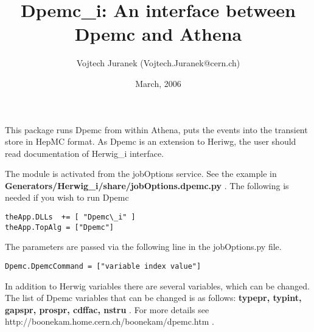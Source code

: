 \documentclass[11pt]{article}
\begin{document}
\title{Dpemc\_i: An interface between Dpemc and Athena}
\author{ Vojtech Juranek (Vojtech.Juranek@cern.ch)}
\date{March, 2006}

\maketitle       

This package runs Dpemc from within Athena, puts the events into the
transient store in HepMC format. 
As Dpemc is an extension to Heriwg, the user should read documentation of Herwig\_i interface. 

The module is activated from the jobOptions service. See the example in {\bf Generators/Herwig\_i/share/jobOptions.dpemc.py }.
The following is needed if you wish to run Dpemc
\begin{verbatim}
theApp.DLLs  += [ "Dpemc\_i" ]  
theApp.TopAlg = ["Dpemc"]
\end{verbatim}
The parameters are passed via the following line in the jobOptions.py
file.
\begin{verbatim}
Dpemc.DpemcCommand = ["variable index value"]
\end{verbatim} 
In addition to Herwig variables there are several variables, which can be changed.
The list of Dpemc variables that can be changed is as follows:
{\bf 
typepr,
typint,
gapspr,
prospr,
cdffac,
nstru
}.
For more details see http://boonekam.home.cern.ch/boonekam/dpemc.htm .
\end{document}
